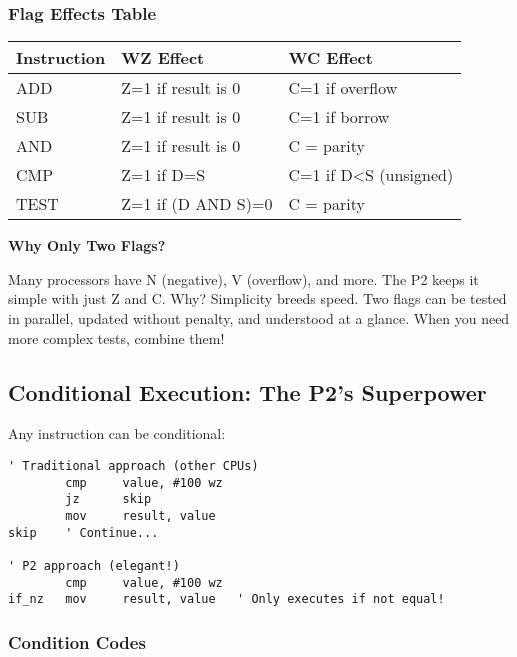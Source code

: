 \documentclass[11pt]{book}
\begin{document}
\hypertarget{flag-effects-table}{%
\subsubsection{Flag Effects Table}\label{flag-effects-table}}

\begin{longtable}[]{@{}lll@{}}
\toprule
Instruction & WZ Effect & WC Effect \\
\midrule
\endhead
ADD & Z=1 if result is 0 & C=1 if overflow \\
SUB & Z=1 if result is 0 & C=1 if borrow \\
AND & Z=1 if result is 0 & C = parity \\
CMP & Z=1 if D=S & C=1 if D\textless S (unsigned) \\
TEST & Z=1 if (D AND S)=0 & C = parity \\
\bottomrule
\end{longtable}

\begin{sidetrack}
\textbf{Why Only Two Flags?}

Many processors have N (negative), V (overflow), and more. The P2 keeps it simple with just Z and C. Why? Simplicity breeds speed. Two flags can be tested in parallel, updated without penalty, and understood at a glance. When you need more complex tests, combine them!
\end{sidetrack}

\hypertarget{conditional-execution-the-p2s-superpower}{%
\subsection{Conditional Execution: The P2's
Superpower}\label{conditional-execution-the-p2s-superpower}}

Any instruction can be conditional:

\begin{lstlisting}
' Traditional approach (other CPUs)
        cmp     value, #100 wz
        jz      skip
        mov     result, value
skip    ' Continue...

' P2 approach (elegant!)
        cmp     value, #100 wz
if_nz   mov     result, value   ' Only executes if not equal!
\end{lstlisting}

\hypertarget{condition-codes}{%
\subsubsection{Condition Codes}\label{condition-codes}}
\end{document}
